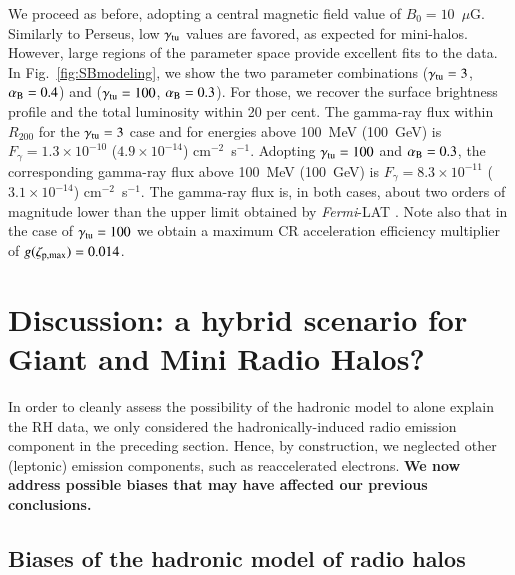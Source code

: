 \documentclass[useAMS,usenatbib]{mn2e}
\begin{document}
We proceed as before, adopting a central magnetic field value of
$B_{0}=10$~$\mu$G. Similarly to Perseus, low $\gamma_{{\mathrm{tu}}}$ values are
favored, as expected for mini-halos. However, large regions of the parameter
space provide excellent fits to the data.  In Fig.~\ref{fig:SBmodeling}, we show the
two parameter combinations ($\gamma_{{\mathrm{tu}}}=3$, $ \alpha_{{\mathrm{B}}}=0.4$) and
($\gamma_{{\mathrm{tu}}}=100$, $ \alpha_{{\mathrm{B}}}=0.3$).  For those, we recover the surface
brightness profile and the total luminosity within 20 per cent. The gamma-ray flux
within $R_{200}$ for the $\gamma_{{\mathrm{tu}}}=3$ case and for energies above
100~MeV (100~GeV) is $F_{\gamma} = 1.3 \times 10^{-10}$ ($4.9 \times 10^{-14}$)
cm$^{-2}$~s$^{-1}$. Adopting $\gamma_{{\mathrm{tu}}}=100$ and $ \alpha_{{\mathrm{B}}}=0.3$, the
corresponding gamma-ray flux above 100~MeV (100~GeV) is $F_{\gamma} = 8.3 \times
10^{-11}$ ($3.1 \times 10^{-14}$) cm$^{-2}$~s$^{-1}$. The gamma-ray flux is, in
both cases, about two orders of magnitude lower than the upper limit obtained by
\emph{Fermi}-LAT \citep{2010ApJ...717L..71A}. Note also that in the case of
$\gamma_{{\mathrm{tu}}} = 100$ we obtain a maximum CR acceleration efficiency
multiplier of $g(\zeta_{{\mathrm{p,max}}})=0.014$.



\section{Discussion: a hybrid scenario for Giant and Mini Radio Halos?}
\label{sec:discussion_hadronic}

In order to cleanly assess the possibility of the hadronic model to alone
explain the RH data, we only considered the hadronically-induced radio emission
component in the preceding section. Hence, by construction, we neglected other
(leptonic) emission components, such as reaccelerated electrons.  {\bf We now
  address possible biases that may have affected our previous conclusions.}


\subsection{Biases of the hadronic model of  radio halos}
\end{document}
